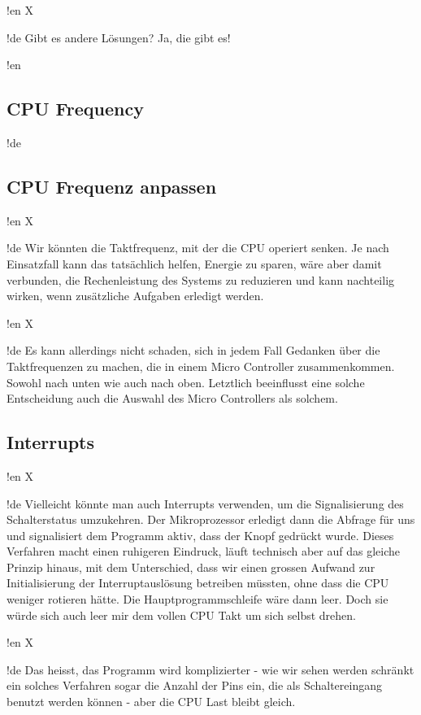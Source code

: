 !en X

!de Gibt es andere Lösungen? Ja, die gibt es!



!en \subsection{CPU Frequency}
!de \subsection{CPU Frequenz anpassen}

!en X

!de Wir könnten die Taktfrequenz, mit der die CPU operiert senken. Je nach Einsatzfall kann das tatsächlich helfen, Energie zu sparen, wäre aber damit verbunden, die Rechenleistung des Systems zu reduzieren und kann nachteilig wirken, wenn zusätzliche Aufgaben erledigt werden.



!en X

!de Es kann allerdings nicht schaden, sich in jedem Fall Gedanken über die Taktfrequenzen zu machen, die in einem Micro Controller zusammenkommen. Sowohl nach unten wie auch nach oben. Letztlich beeinflusst eine solche Entscheidung auch die Auswahl des Micro Controllers als solchem.



\subsection{Interrupts}

!en X

!de Vielleicht könnte man auch Interrupts verwenden, um die Signalisierung des Schalterstatus umzukehren. Der Mikroprozessor erledigt dann die Abfrage für uns und signalisiert dem Programm aktiv, dass der Knopf gedrückt wurde. Dieses Verfahren macht einen ruhigeren Eindruck, läuft technisch aber auf das gleiche Prinzip hinaus, mit dem Unterschied, dass wir einen grossen Aufwand zur Initialisierung der Interruptauslösung betreiben müssten, ohne dass die CPU weniger rotieren hätte. Die Hauptprogrammschleife wäre dann leer. Doch sie würde sich auch leer mir dem vollen CPU Takt um sich selbst drehen.



!en X

!de Das heisst, das Programm wird komplizierter - wie wir sehen werden schränkt ein solches Verfahren sogar die Anzahl der Pins ein, die als Schaltereingang benutzt werden können - aber die CPU Last bleibt gleich.


